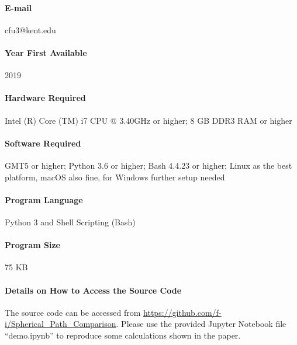 \paragraph{E-mail} cfu3@kent.edu
\paragraph{Year First Available} 2019
\paragraph{Hardware Required} Intel (R) Core (TM) i7 CPU @
3.40GHz or higher; 8 GB DDR3 RAM or higher
\paragraph{Software Required} GMT5 or higher; Python 3.6 or higher; Bash 4.4.23
or higher; Linux as the best platform, macOS also fine, for Windows further
setup needed
\paragraph{Program Language} Python 3 and Shell Scripting (Bash)
\paragraph{Program Size} 75 KB
\paragraph{Details on How to Access the Source Code} The source code can be
accessed from \url{https://github.com/f-i/Spherical_Path_Comparison}. Please use
the provided Jupyter Notebook file ``demo.ipynb'' to reproduce some calculations
shown in the paper.
